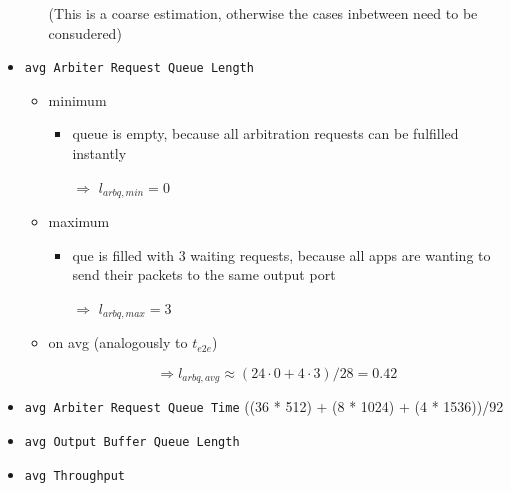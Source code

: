 \documentclass[]{scrartcl}
\begin{document}
\begin{itemize}
\begin{itemize}
                    (This is a coarse estimation, otherwise the cases inbetween need to be consudered)
            \end{itemize}
        \item \verb|avg Arbiter Request Queue Length|
            \begin{itemize}
                \item minimum
                    \begin{itemize}
                        \item queue is empty, because all arbitration requests can be fulfilled instantly
                        \item[$\Rightarrow$] $l_{arbq,min} = 0$
                    \end{itemize}
                \item maximum
                    \begin{itemize}
                        \item que is filled with 3 waiting requests, because all apps are wanting to send their packets to the same output port
                        \item[$\Rightarrow$] $l_{arbq,max} = 3$
                    \end{itemize}
                \item on avg (analogously to $t_{e2e}$)
                    
                    \[\Rightarrow l_{arbq,avg} \approx \left(24\cdot 0+4\cdot 3 \right)/28 = 0.42\]
            \end{itemize}
        \item \verb|avg Arbiter Request Queue Time|
            ((36 * 512) + (8 * 1024) + (4 * 1536))/92
        \item \verb|avg Output Buffer Queue Length|
        \item \verb|avg Throughput|
    \end{itemize}
\end{document}
